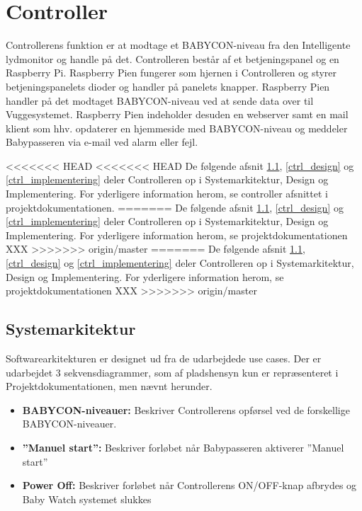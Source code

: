 \chapter{Controller}

Controllerens funktion er at modtage et BABYCON-niveau fra den Intelligente lydmonitor og handle på det. Controlleren består af et betjeningspanel og en Raspberry Pi. Raspberry Pien fungerer som hjernen i Controlleren og styrer betjeningspanelets dioder og handler på panelets knapper. Raspberry Pien handler på det modtaget BABYCON-niveau ved at sende data over \iic til Vuggesystemet. Raspberry Pien indeholder desuden en webserver samt en mail klient som hhv. opdaterer en hjemmeside med BABYCON-niveau og meddeler Babypasseren via e-mail ved alarm eller fejl.

<<<<<<< HEAD
<<<<<<< HEAD
De følgende afsnit \ref{ctrl_sysark}, \ref{ctrl_design} og \ref{ctrl_implementering} deler Controlleren op i Systemarkitektur, Design og Implementering. For yderligere information herom, se controller afsnittet i projektdokumentationen.
=======
De følgende afsnit \ref{ctrl_sysark},   \ref{ctrl_design} og \ref{ctrl_implementering} deler Controlleren op i Systemarkitektur, Design og Implementering. For yderligere information herom, se projektdokumentationen XXX
>>>>>>> origin/master
=======
De følgende afsnit \ref{ctrl_sysark},   \ref{ctrl_design} og \ref{ctrl_implementering} deler Controlleren op i Systemarkitektur, Design og Implementering. For yderligere information herom, se projektdokumentationen XXX
>>>>>>> origin/master

\section{Systemarkitektur}
\label{ctrl_sysark}

Softwarearkitekturen er designet ud fra de udarbejdede use cases. Der er udarbejdet 3 sekvensdiagrammer, som af pladshensyn kun er repræsenteret i Projektdokumentationen, men nævnt herunder. 

\begin{itemize}
\item \textbf{BABYCON-niveauer:} Beskriver Controllerens opførsel ved de forskellige BABYCON-niveauer.
\item \textbf{''Manuel start'':} Beskriver forløbet når Babypasseren aktiverer ''Manuel start''
\item \textbf{Power Off:} Beskriver forløbet når Controllerens ON/OFF-knap afbrydes og Baby Watch systemet slukkes 
\end{itemize}

